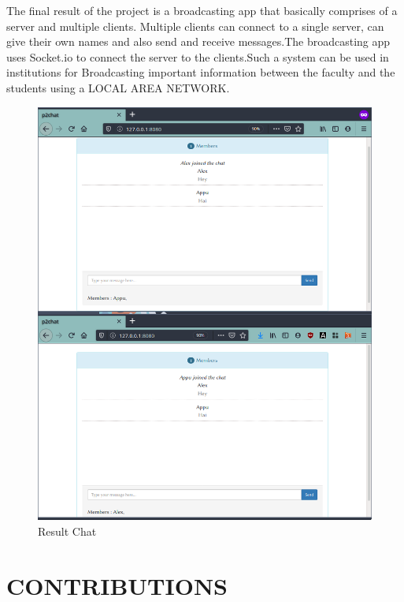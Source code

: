 \documentclass{fisatproject}
\begin{document}
The final result of the project is a broadcasting app that basically comprises of a server and multiple clients. Multiple clients can connect to a single server, can give their own names and also send and receive messages.The broadcasting app uses Socket.io to connect the server to the clients.Such a system can be used in institutions for Broadcasting important information between the faculty and the students using a LOCAL AREA NETWORK.
\newpage
	\begin{center}
	\begin{figure}[h]
		
		\includegraphics[scale=.5]{result.png}
		\caption{Result Chat}
		
	\end{figure}
\end{center}











\chapter{CONTRIBUTIONS}
\end{document}
